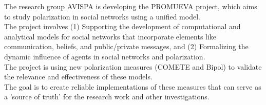 \documentclass[preview]{standalone}
\begin{document}
The research group AVISPA is developing the PROMUEVA project, which aims to study polarization in social networks using a unified model.\\The project involves (1) Supporting the development of computational and analytical models for social networks that incorporate elements like communication, beliefs, and public/private messages, and (2) Formalizing the dynamic influence of agents in social networks and polarization.\\The project is using new polarization measures (COMETE and Bipol) to validate the relevance and effectiveness of these models.\\The goal is to create reliable implementations of these measures that can serve as a 'source of truth' for the research work and other investigations.\\
\end{document}
